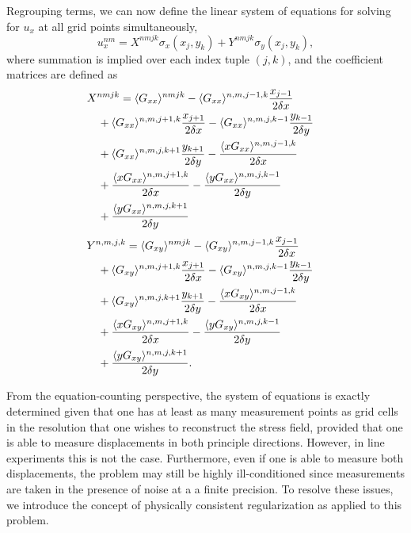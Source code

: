 \documentclass[aps,prl,reprint,twocolumn,groupedaddress,showpacs]{revtex4-1}
\begin{document}
Regrouping terms, we can now define the linear system of equations for solving for $u_x$ at all grid points simultaneously,
\begin{equation}
u_x^{nm} = X^{nmjk}\sigma_{x}(x_j,y_k) + Y^{nmjk}\sigma_{y}(x_j,y_k),
\label{eq:linearsystem1}
\end{equation}
where summation is implied over each index tuple $(j,k)$, and the coefficient matrices are defined as
\begin{align}
\lefteqn{X^{nmjk} = \langle G_{xx} \rangle^{nmjk} -  \langle G_{xx} \rangle^{n,m,j-1,k}\frac{x_{j-1}}{2\delta x} } \nonumber\\
&\quad  + \langle G_{xx} \rangle^{n,m,j+1,k}\frac{x_{j+1}}{2\delta x} -  \langle G_{xx} \rangle^{n,m,j,k-1}\frac{y_{k-1}}{2\delta y}  \nonumber\\
&\quad + \langle G_{xx} \rangle^{n,m,j,k+1}\frac{y_{k+1}}{2\delta y} -\frac{\langle xG_{xx} \rangle^{n,m,j-1,k}}{2\delta x}  \nonumber\\
&\quad +\frac{\langle xG_{xx} \rangle^{n,m,j+1,k}}{2\delta x} - \frac{\langle yG_{xx} \rangle^{n,m,j,k-1}}{2\delta y} \nonumber\\
&\quad+\frac{\langle yG_{xx} \rangle^{n,m,j,k+1}}{2\delta y} \label{eq:linearsystemX}
\end{align}
\begin{align}
\lefteqn{ Y^{n,m,j,k} =  \langle G_{xy} \rangle^{nmjk} - \langle G_{xy} \rangle^{n,m,j-1,k}\frac{x_{j-1}}{2\delta x} } \nonumber\\
&\quad+\langle G_{xy} \rangle^{n,m,j+1,k}\frac{x_{j+1}}{2\delta x} - \langle G_{xy} \rangle^{n,m,j,k-1}\frac{y_{k-1}}{2\delta y} \nonumber\\
&\quad+\langle G_{xy} \rangle^{n,m,j,k+1}\frac{y_{k+1}}{2\delta y}  -\frac{\langle xG_{xy} \rangle^{n,m,j-1,k}}{2\delta x} \nonumber \\
&\quad +\frac{\langle xG_{xy} \rangle^{n,m,j+1,k}}{2\delta x} - \frac{\langle yG_{xy} \rangle^{n,m,j,k-1}}{2\delta y} \nonumber\\
 &\quad+\frac{\langle yG_{xy} \rangle^{n,m,j,k+1}}{2\delta y}.\label{eq:linearsystemY}
\end{align}


From the equation-counting perspective, the system of equations is exactly determined given that one has at least as many measurement points as grid cells in the resolution that one wishes to reconstruct the stress field, provided that one is able to measure displacements in both principle directions. However, in line experiments this is not the case. Furthermore, even if one is able to measure both displacements, the problem may still be highly ill-conditioned since measurements are taken in the presence of noise at a a finite precision. To resolve these issues, we introduce  the concept of physically consistent regularization as applied to this problem.
\end{document}
